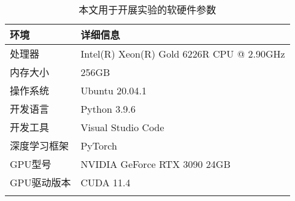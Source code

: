\begin{table}[htbp]
    \caption{\label{tab:environment}本文用于开展实验的软硬件参数}
    \small
    \renewcommand{\arraystretch}{1.5}
    \begin{tabularx}{\linewidth}{p{5cm}<{\centering}X<{\centering}}
        \Xhline{2\arrayrulewidth}
        环境      & 详细信息                                      \\ \hline
        处理器     & Intel(R) Xeon(R) Gold 6226R CPU @ 2.90GHz \\
        内存大小    & 256GB                                     \\
        操作系统    & Ubuntu 20.04.1                            \\
        开发语言    & Python 3.9.6                              \\
        开发工具    & Visual Studio Code                        \\
        深度学习框架  & PyTorch                                   \\
        GPU型号   & NVIDIA GeForce RTX 3090 24GB              \\
        GPU驱动版本 & CUDA 11.4                                 \\ 
        \Xhline{2\arrayrulewidth}
        \end{tabularx}
\end{table}

